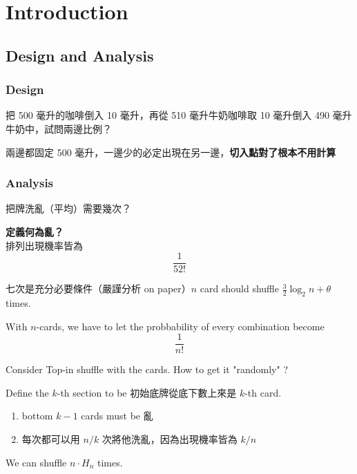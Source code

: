 \chapter{Introduction}

\section{Design and Analysis}

\subsection{Design}

\begin{remark}
\end{remark}
\begin{exercise}
        把 500 毫升的咖啡倒入 10 毫升，再從 510 毫升牛奶咖啡取 10 毫升倒入 490 毫升牛奶中，試問兩邊比例？
\end{exercise}
\begin{answer} 
    兩邊都固定 500 毫升，一邊少的必定出現在另一邊，\textbf{切入點對了根本不用計算}
\end{answer}

\subsection{Analysis}

\begin{exercise}[Card]
        把牌洗亂（平均）需要幾次？
\end{exercise}
\begin{answer}
    \begin{note}
        \textbf{定義何為亂？}\\
        排列出現機率皆為
        \[
        \frac{1}{52!}
        \]
    \end{note}
        七次是充分必要條件（嚴謹分析 on paper）$n$ card should shuffle $\frac{3}{2}\log_2 n + \theta$ times.
\end{answer}

\begin{definition}[亂]
    With $n$-cards, we have to let the probbability of every combination become 
    \[
    \frac{1}{n!}
    \]
\end{definition}

\begin{exercise}
    Consider Top-in shuffle with the cards. How to get it "randomly" ?
\end{exercise}
\begin{answer}
    Define the $k$-th section to be 初始底牌從底下數上來是 $k$-th card.

    \begin{enumerate}
        \item bottom $k-1$ cards must be 亂
        \item 每次都可以用 $n/k$ 次將他洗亂，因為出現機率皆為 $k/n$
    \end{enumerate}

    We can shuffle $n \cdot H_n$ times.
\end{answer}

